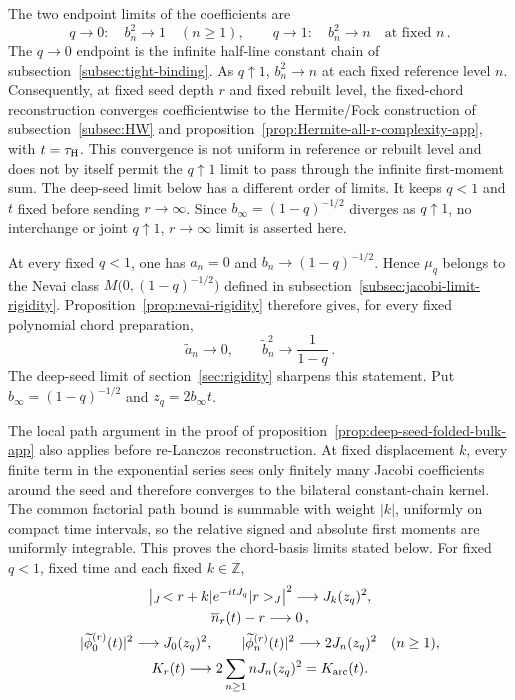 \documentclass[a4paper,11pt]{article}
\def\ket#1{|#1>}%
\def\bra#1{<#1|}%
\def\ii{i}%
\def\ee{e}%
\def\Jac{J}%
\theoremstyle{definition}
\theoremstyle{remark}
\newcommand{\ket}[1]{|#1\rangle}
\newcommand{\bra}[1]{\langle #1|}
\newcommand{\ii}{\mathrm i}
\newcommand{\ee}{\mathrm e}
\newcommand{\Jac}{\mathsf J}
\begin{document}
The two endpoint limits of the coefficients are
\begin{equation}
   q\to0:\quad b_n^2\to1\quad(n\ge1),
   \qquad
   q\to1:\quad b_n^2\to n\quad\text{at fixed }n\,.
   \label{eq:chord-limits}
\end{equation}
The $q\to0$ endpoint is the infinite half-line constant chain of
subsection~\ref{subsec:tight-binding}.  As $q\uparrow1$, $b_n^2\to n$ at each fixed reference level
$n$.  Consequently, at fixed seed depth $r$ and fixed rebuilt level, the fixed-chord
reconstruction converges coefficientwise to the Hermite/Fock construction of
subsection~\ref{subsec:HW} and proposition~\ref{prop:Hermite-all-r-complexity-app}, with
$t=\tau_{\rm H}$.  This convergence is not uniform in reference or rebuilt level and does not by
itself permit the $q\uparrow1$ limit to pass through the infinite first-moment sum.  The deep-seed
limit below has a different order of limits.  It keeps $q<1$ and $t$ fixed before sending
$r\to\infty$.  Since $b_\infty=(1-q)^{-1/2}$ diverges as $q\uparrow1$, no interchange or joint
$q\uparrow1$, $r\to\infty$ limit is asserted here.

 

At every fixed $q<1$, one has $a_n=0$ and
$b_n\to(1-q)^{-1/2}$.  Hence $\mu_q$ belongs to the Nevai class
$M\bigl(0,(1-q)^{-1/2}\bigr)$ defined in
subsection~\ref{subsec:jacobi-limit-rigidity}.
  Proposition~\ref{prop:nevai-rigidity} therefore gives, for every fixed
polynomial chord preparation,
\begin{equation}
   \widetilde a_n\longrightarrow0,
   \qquad
   \widetilde b_n^2\longrightarrow\frac{1}{1-q}\,.
   \label{eq:chord-preparation-rigidity}
\end{equation}
The deep-seed limit of section~\ref{sec:rigidity} sharpens this statement.  Put
$b_\infty=(1-q)^{-1/2}$ and $z_q=2b_\infty t$.

The local path argument in the proof of
proposition~\ref{prop:deep-seed-folded-bulk-app} also applies before re-Lanczos reconstruction.
At fixed displacement $k$, every finite term in the exponential series sees only finitely many
Jacobi coefficients around the seed and therefore converges to the bilateral constant-chain
kernel.  The common factorial path bound is summable with weight $|k|$, uniformly on compact time
intervals, so the relative signed and absolute first moments are uniformly integrable.  This
proves the chord-basis limits stated below.
For fixed $q<1$, fixed time and each fixed $k\in\mathbb Z$,
\begin{equation}
\begin{gathered}
   \left|{}_{\Jac}\!\bra{r+k}\ee^{-\ii t\Jac_q}\ket r_{\Jac}\right|^2
   \longrightarrow J_k(z_q)^2,\\
   \overline n_r(t)-r\longrightarrow0\,,\\
   |\widetilde\phi_0^{(r)}(t)|^2\longrightarrow J_0(z_q)^2,\qquad
   |\widetilde\phi_n^{(r)}(t)|^2\longrightarrow2J_n(z_q)^2\quad(n\ge1),\\
   K_r(t)\longrightarrow2\sum_{n\ge1}nJ_n(z_q)^2=K_{\rm arc}(t).
\end{gathered}
   \label{eq:deep-chord-folding}
\end{equation}
\end{document}
